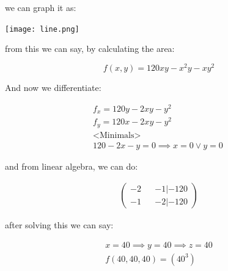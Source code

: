 \documentclass[11pt,fleqn]{book} %
\begin{document}
we can graph it as:

\begin{center}
    \texttt{[image: line.png]}
\end{center}

from this we can say, by calculating the area:

\begin{equation}
    f(x,y) = 120xy -x^2y - xy^2
\end{equation}

And now we differentiate:

\begin{gather}
    f_x = 120y -2xy - y^2 \\
    f_y = 120x - 2xy -y^2 \\
    \text{<Minimals>} \\
    120 - 2x - y = 0 \implies x = 0 \vee y = 0 \
\end{gather}

and from linear algebra, we can do:

\begin{gather}
    \begin{pmatrix}
        -2 && -1 | -120 \\
        -1 && -2 | -120
    \end{pmatrix} 
\end{gather}

after solving this we can say:

\begin{gather}
    x = 40 \implies y = 40 \implies z = 40 \\
    f(40,40,40) = (40^3)
\end{gather}







\end{document}

